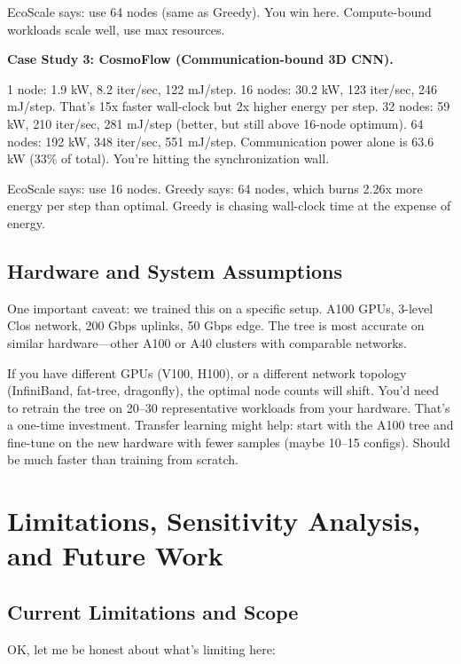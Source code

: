 \documentclass[conference]{IEEEtran}
\begin{document}
EcoScale says: use 64 nodes (same as Greedy). You win here. Compute-bound workloads scale well, use max resources.

\textbf{Case Study 3: CosmoFlow (Communication-bound 3D CNN).}

1 node: 1.9 kW, 8.2 iter/sec, 122 mJ/step. 16 nodes: 30.2 kW, 123 iter/sec, 246 mJ/step. That's 15x faster wall-clock but 2x higher energy per step. 32 nodes: 59 kW, 210 iter/sec, 281 mJ/step (better, but still above 16-node optimum). 64 nodes: 192 kW, 348 iter/sec, 551 mJ/step. Communication power alone is 63.6 kW (33\% of total). You're hitting the synchronization wall.

EcoScale says: use 16 nodes. Greedy says: 64 nodes, which burns 2.26x more energy per step than optimal. Greedy is chasing wall-clock time at the expense of energy.

\subsection{Hardware and System Assumptions}

One important caveat: we trained this on a specific setup. A100 GPUs, 3-level Clos network, 200 Gbps uplinks, 50 Gbps edge. The tree is most accurate on similar hardware---other A100 or A40 clusters with comparable networks.

If you have different GPUs (V100, H100), or a different network topology (InfiniBand, fat-tree, dragonfly), the optimal node counts will shift. You'd need to retrain the tree on 20--30 representative workloads from your hardware. That's a one-time investment. Transfer learning might help: start with the A100 tree and fine-tune on the new hardware with fewer samples (maybe 10--15 configs). Should be much faster than training from scratch.

\section{Limitations, Sensitivity Analysis, and Future Work}

\subsection{Current Limitations and Scope}

OK, let me be honest about what's limiting here:
\end{document}
